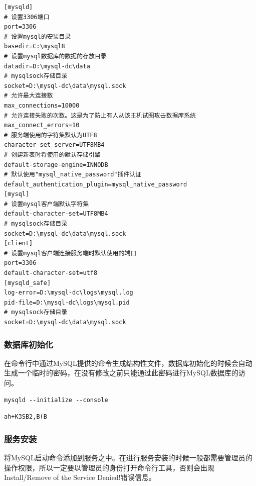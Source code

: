 \documentclass[12pt, openany, oneside]{book}
\begin{document}

\begin{lstlisting}
[mysqld]
# 设置3306端口
port=3306
# 设置mysql的安装目录
basedir=C:\mysql8
# 设置mysql数据库的数据的存放目录
datadir=D:\mysql-dc\data
# mysqlsock存储目录
socket=D:\mysql-dc\data\mysql.sock
# 允许最大连接数
max_connections=10000
# 允许连接失败的次数。这是为了防止有人从该主机试图攻击数据库系统
max_connect_errors=10
# 服务端使用的字符集默认为UTF8
character-set-server=UTF8MB4
# 创建新表时将使用的默认存储引擎
default-storage-engine=INNODB
# 默认使用"mysql_native_password"插件认证
default_authentication_plugin=mysql_native_password
[mysql]
# 设置mysql客户端默认字符集
default-character-set=UTF8MB4
# mysqlsock存储目录
socket=D:\mysql-dc\data\mysql.sock
[client]
# 设置mysql客户端连接服务端时默认使用的端口
port=3306
default-character-set=utf8
[mysqld_safe]
log-error=D:\mysql-dc\logs\mysql.log
pid-file=D:\mysql-dc\logs\mysql.pid
# mysqlsock存储目录
socket=D:\mysql-dc\data\mysql.sock
\end{lstlisting}

\subsubsection{数据库初始化}

在命令行中通过MySQL提供的命令生成结构性文件，数据库初始化的时候会自动生成一个临时的密码，在没有修改之前只能通过此密码进行MySQL数据库的访问。\\


\begin{lstlisting}
mysqld --initialize --console
\end{lstlisting}

\begin{tcolorbox}
	\begin{verbatim}
ah+K3SB2,B(B
	\end{verbatim}
\end{tcolorbox}

\subsubsection{服务安装}

将MySQL启动命令添加到服务之中。在进行服务安装的时候一般都需要管理员的操作权限，所以一定要以管理员的身份打开命令行工具，否则会出现Install/Remove of the Service Denied!错误信息。\\

\end{document}
